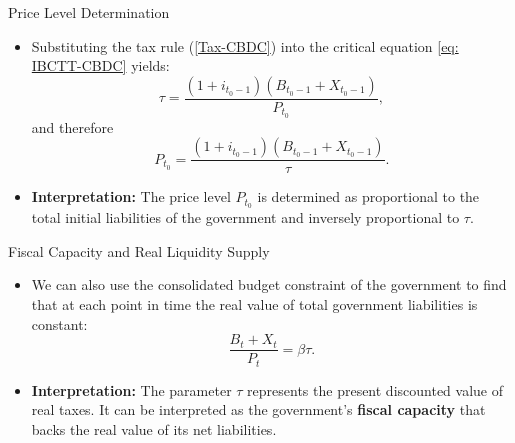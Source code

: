 \documentclass[11pt,aspectratio=169]{beamer}
\begin{document}

\begin{frame}{Price Level Determination}
\small
\begin{itemize}
    \item Substituting the tax rule (\ref{Tax-CBDC}) into the critical equation \eqref{eq: IBCTT-CBDC} yields:
\begin{equation*}
\tau =\frac{(1+i_{t_{0}-1})(B_{t_{0}-1}+X_{t_{0}-1})}{P_{t_{0}}},
\end{equation*}
and therefore
\begin{equation*}
P_{t_{0}}=\frac{(1+i_{t_{0}-1})(B_{t_{0}-1}+X_{t_{0}-1})}{\tau }.
\end{equation*}
\item \textbf{Interpretation:} The price level $P_{t_0}$ is determined as proportional to the total initial liabilities of the government and inversely proportional to $\tau$.
\end{itemize}
\end{frame}


\begin{frame}[label=fiscal_capacity]{Fiscal Capacity and Real Liquidity Supply}
\small
\begin{itemize}
\item We can also use the consolidated budget constraint of the government to find that at each point in time the real value of total government liabilities is constant:
\begin{equation}
\frac{B_{t}+X_{t}}{P_{t}}=\beta \tau . \label{Ex: P}
\end{equation}
\item \textbf{Interpretation:} The parameter $\tau$ represents the present discounted value of real taxes. It can be interpreted as the government's \textbf{fiscal capacity} that backs the real value of its net liabilities.
\vspace{0.25cm}
\end{itemize}
\begin{center} \hyperlink{fiscal_cap}{} \end{center}

\end{frame}

\end{document}

